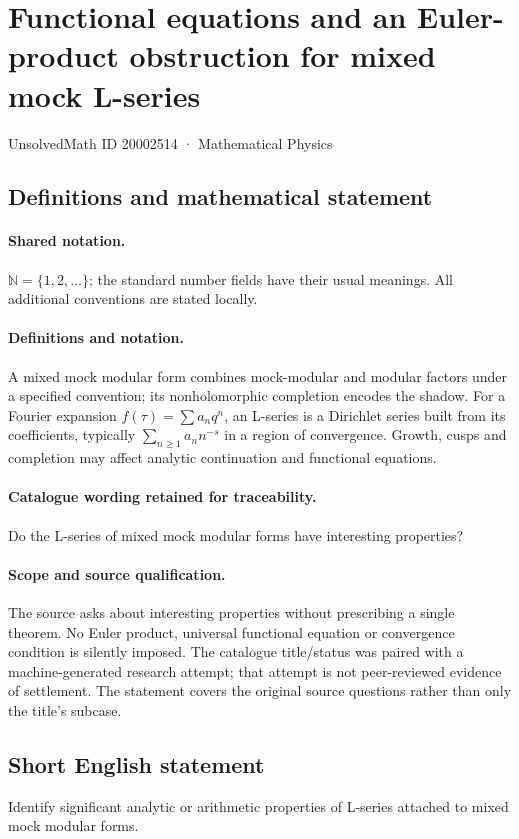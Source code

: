 \documentclass[11pt]{article}
\begin{document}
\setcounter{section}{20002513}
\section{Functional equations and an Euler-product obstruction for mixed mock L-series}\label{20002514}
{\small UnsolvedMath ID 20002514 · Mathematical Physics}
\subsection{Definitions and mathematical statement}

\paragraph{Shared notation.}$\mathbb N=\{1,2,\ldots\}$; the standard number fields have their usual meanings. All additional conventions are stated locally.


\paragraph{Definitions and notation.}A mixed mock modular form combines mock-modular and modular factors under a specified convention; its nonholomorphic completion encodes the shadow. For a Fourier expansion $f(\tau)=\sum a_nq^n$, an L-series is a Dirichlet series built from its coefficients, typically $\sum_{n\ge1}a_n n^{-s}$ in a region of convergence. Growth, cusps and completion may affect analytic continuation and functional equations.

\paragraph{Catalogue wording retained for traceability.}
Do the L-series of mixed mock modular forms have interesting properties?
\paragraph{Scope and source qualification.}The source asks about interesting properties without prescribing a single theorem. No Euler product, universal functional equation or convergence condition is silently imposed. The catalogue title/status was paired with a machine-generated research attempt; that attempt is not peer-reviewed evidence of settlement. The statement covers the original source questions rather than only the title’s subcase.
\subsection{Short English statement}
Identify significant analytic or arithmetic properties of L-series attached to mixed mock modular forms.
\end{document}
